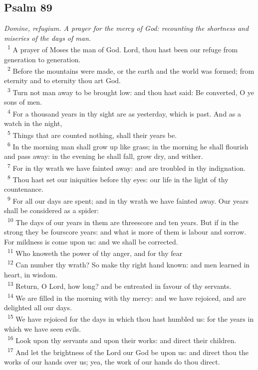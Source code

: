 \documentclass[a5paper,12pt]{article}
\begin{document}
\begin{multicols*}{2}
\section{Psalm 89}
\label{sec:org4b76081}
\emph{Domine, refugium. A prayer for the mercy of God: recounting the shortness and miseries of the days of man.}\\

~\textsuperscript{1} A prayer of Moses the man of God. Lord, thou hast been our refuge from generation to generation.\\
~\textsuperscript{2} Before the mountains were made, or the earth and the world was formed; from eternity and to eternity thou art God.\\
~\textsuperscript{3} Turn not man away to be brought low: and thou hast said: Be converted, O ye sons of men.\\
~\textsuperscript{4} For a thousand years in thy sight are as yesterday, which is past. And as a watch in the night,\\
~\textsuperscript{5} Things that are counted nothing, shall their years be.\\
~\textsuperscript{6} In the morning man shall grow up like grass; in the morning he shall flourish and pass away: in the evening he shall fall, grow dry, and wither.\\
~\textsuperscript{7} For in thy wrath we have fainted away: and are troubled in thy indignation.\\
~\textsuperscript{8} Thou hast set our iniquities before thy eyes: our life in the light of thy countenance.\\
~\textsuperscript{9} For all our days are spent; and in thy wrath we have fainted away. Our years shall be considered as a spider:\\
~\textsuperscript{10} The days of our years in them are threescore and ten years. But if in the strong they be fourscore years: and what is more of them is labour and sorrow. For mildness is come upon us: and we shall be corrected.\\
~\textsuperscript{11} Who knoweth the power of thy anger, and for thy fear\\
~\textsuperscript{12} Can number thy wrath? So make thy right hand known: and men learned in heart, in wisdom.\\
~\textsuperscript{13} Return, O Lord, how long? and be entreated in favour of thy servants.\\
~\textsuperscript{14} We are filled in the morning with thy mercy: and we have rejoiced, and are delighted all our days.\\
~\textsuperscript{15} We have rejoiced for the days in which thou hast humbled us: for the years in which we have seen evils.\\
~\textsuperscript{16} Look upon thy servants and upon their works: and direct their children.\\
~\textsuperscript{17} And let the brightness of the Lord our God be upon us: and direct thou the works of our hands over us; yea, the work of our hands do thou direct.\\


\end{multicols*}
\end{document}
